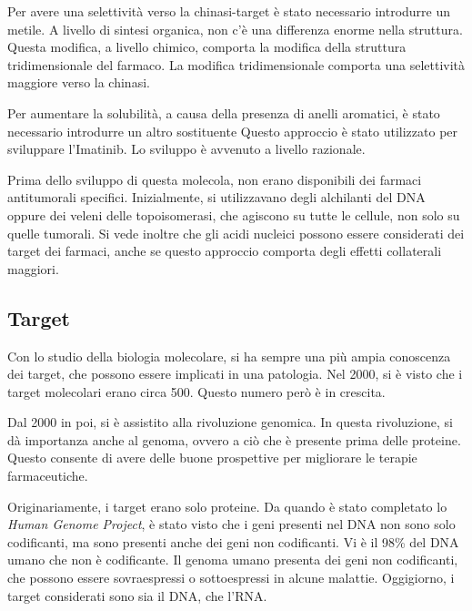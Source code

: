 
Per avere una selettività verso la chinasi-target è stato necessario
introdurre un metile. A livello di sintesi organica, non c'è una
differenza enorme nella struttura. Questa modifica, a livello chimico,
comporta la modifica della struttura tridimensionale del farmaco. La
modifica tridimensionale comporta una selettività maggiore verso la
chinasi.

Per aumentare la solubilità, a causa della presenza di anelli aromatici,
è stato necessario introdurre un altro sostituente
Questo approccio è stato utilizzato per sviluppare l'Imatinib. Lo
sviluppo è avvenuto a livello razionale.


Prima dello sviluppo di questa molecola, non erano disponibili dei
farmaci antitumorali specifici. Inizialmente, si utilizzavano degli
alchilanti del DNA oppure dei veleni delle topoisomerasi, che agiscono
su tutte le cellule, non solo su quelle tumorali. Si vede inoltre che
gli acidi nucleici possono essere considerati dei target dei farmaci,
anche se questo approccio comporta degli effetti collaterali maggiori.


\subsection{Target}

Con lo studio della biologia molecolare, si ha sempre una più ampia
conoscenza dei target, che possono essere implicati in una patologia.
Nel 2000, si è visto che i target molecolari erano circa 500. Questo
numero però è in crescita.

Dal 2000 in poi, si è assistito alla rivoluzione genomica. In questa
rivoluzione, si dà importanza anche al genoma, ovvero a ciò che è
presente prima delle proteine. Questo consente di avere delle buone
prospettive per migliorare le terapie farmaceutiche.


Originariamente, i target erano solo proteine. Da quando è stato
completato lo \emph{Human Genome Project}, è stato visto che i geni
presenti nel DNA non sono solo codificanti, ma sono presenti anche dei
geni non codificanti. Vi è il 98\% del DNA umano che non è codificante.
Il genoma umano presenta dei geni non codificanti, che possono essere
sovraespressi o sottoespressi in alcune malattie. Oggigiorno, i target
considerati sono sia il DNA, che l'RNA.{}

